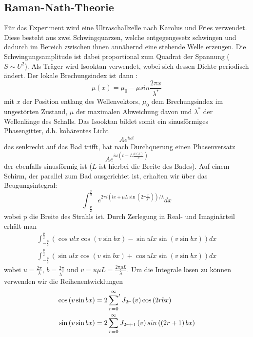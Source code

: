 \subsection{Raman-Nath-Theorie}
Für das Experiment wird eine Ultraschallzelle nach Karolus und Fries \cite{Karolus} verwendet. Diese besteht aus zwei Schwingquarzen, welche entgegengesetz schwingen und dadurch im Bereich zwischen ihnen annähernd eine stehende Welle erzeugen. Die Schwingungsamplitude ist dabei proportional zum Quadrat der Spannung ( $S \sim U^2$). Als Träger wird Isooktan verwendet, wobei sich dessen Dichte periodisch ändert. Der lokale Brechungsindex ist dann \cite{Raman}: 
\begin{equation}
 \mu \left( x \right) = \mu_0 - \mu sin \frac{2 \pi x}{ \lambda^*}
\end{equation}
mit $x$ der Position entlang des Wellenvektors, $\mu_0$ dem Brechungsindex im ungestörten Zustand, $\mu$ der maximalen Abweichung davon und $\lambda^*$ der Wellenlänge des Schalls. Das Isooktan bildet somit ein sinusförmiges Phasengitter, d.h. kohärentes Licht
\begin{equation}
 A e^{i \omega t}
\end{equation}
das senkrecht auf das Bad trifft, hat nach Durchquerung einen Phasenversatz
\begin{equation}
 A e^{i \omega \left( t - L \frac{\mu \left( x \right)}{c} \right)}
\end{equation}
der ebenfalls sinusförmig ist ($L$ ist hierbei die Breite des Bades). 
Auf einem Schirm, der parallel zum Bad ausgerichtet ist, erhalten wir über das Beugungsintegral:
\begin{equation}
 \int_{-\frac{p}{2}}^{\frac{p}{2}} e^{2 \pi i \left( l x + \mu L \sin \left( 2 \pi \frac{x}{\lambda^*} \right) \right) / \lambda } dx
\end{equation}
wobei p die Breite des Strahls ist. Durch Zerlegung in Real- und Imaginärteil erhält man
\begin{align}
 \int_{-\frac{p}{2}}^{\frac{p}{2}} \left( \cos ulx \cos \left( v \sin bx \right) - \sin ulx \sin \left( v \sin bx \right) \right) dx \\
\int_{-\frac{p}{2}}^{\frac{p}{2}} \left( \sin ulx \cos \left( v \sin bx \right) + \cos ulx \sin \left( v \sin bx \right) \right) dx
\end{align}
wobei $u = \frac{2 \pi}{\lambda}$, $b = \frac{2 \pi}{\lambda^*}$ und $v= u \mu L = \frac{2 \pi \mu L}{\lambda}$.
Um die Integrale lösen zu können verwenden wir die Reihenentwicklungen
\begin{align}
 \cos \left( v \sin bx \right) & =  2 \sideset{}{'} \sum_{r=0}^{\infty} J_{2r} \left( v \right) \cos \left( 2rbx \right) \\
 \sin \left( v \sin bx \right) & =  2 \sum_{r=0}^{\infty} J_{2r+1} \left( v \right) sin \left( \left( 2r+1 \right) bx \right)
\end{align}
